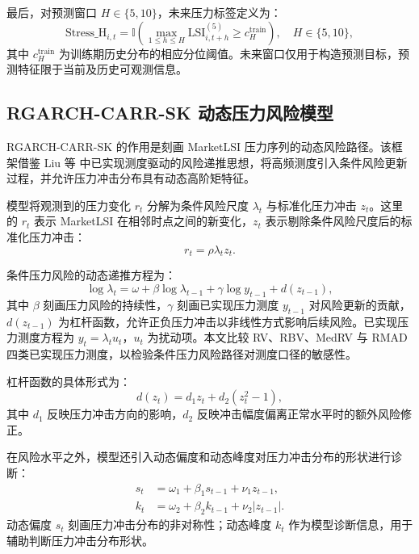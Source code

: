 \documentclass[12pt,a4paper]{ctexart}
\newcommand{\LSI}{\mathrm{LSI}}
\newcommand{\StressH}{\mathrm{Stress\_H}}
\begin{document}
最后，对预测窗口 $H\in\{5,10\}$，未来压力标签定义为：
\begin{equation}
\StressH_{i,t}
=\mathbb{I}\!\left(\max_{1\leq h\leq H} \LSI^{(5)}_{i,t+h}\geq c^{\mathrm{train}}_H\right),
\quad H\in\{5,10\},
\end{equation}
其中 $c^{\mathrm{train}}_H$ 为训练期历史分布的相应分位阈值。未来窗口仅用于构造预测目标，预测特征限于当前及历史可观测信息。

\subsection{RGARCH-CARR-SK 动态压力风险模型}
\label{subsec:rgarch}

RGARCH-CARR-SK 的作用是刻画 MarketLSI 压力序列的动态风险路径。该框架借鉴 Liu 等 \cite{liu2025rgarchcarrsk} 中已实现测度驱动的风险递推思想，将高频测度引入条件风险更新过程，并允许压力冲击分布具有动态高阶矩特征。

模型将观测到的压力变化 $r_t$ 分解为条件风险尺度 $\lambda_t$ 与标准化压力冲击 $z_t$。这里的 $r_t$ 表示 MarketLSI 在相邻时点之间的新变化，$z_t$ 表示剔除条件风险尺度后的标准化压力冲击：
\begin{equation}
r_t=\rho\lambda_t z_t.
\end{equation}

条件压力风险的动态递推方程为：
\begin{equation}
\log \lambda_t
=\omega
+\beta \log \lambda_{t-1}
+\gamma \log y_{t-1}
+d(z_{t-1}),
\end{equation}
其中 $\beta$ 刻画压力风险的持续性，$\gamma$ 刻画已实现压力测度 $y_{t-1}$ 对风险更新的贡献，$d(z_{t-1})$ 为杠杆函数，允许正负压力冲击以非线性方式影响后续风险。已实现压力测度方程为 $y_t=\lambda_t u_t$，$u_t$ 为扰动项。本文比较 RV、RBV、MedRV 与 RMAD 四类已实现压力测度，以检验条件压力风险路径对测度口径的敏感性。

杠杆函数的具体形式为：
\begin{equation}
d(z_t)=d_1 z_t+d_2(z_t^2-1),
\end{equation}
其中 $d_1$ 反映压力冲击方向的影响，$d_2$ 反映冲击幅度偏离正常水平时的额外风险修正。

在风险水平之外，模型还引入动态偏度和动态峰度对压力冲击分布的形状进行诊断：
\begin{align}
s_t&=\omega_1+\beta_1s_{t-1}+\nu_1 z_{t-1}, \\
k_t&=\omega_2+\beta_2k_{t-1}+\nu_2 |z_{t-1}|.
\end{align}
动态偏度 $s_t$ 刻画压力冲击分布的非对称性；动态峰度 $k_t$ 作为模型诊断信息，用于辅助判断压力冲击分布形状。
\end{document}
